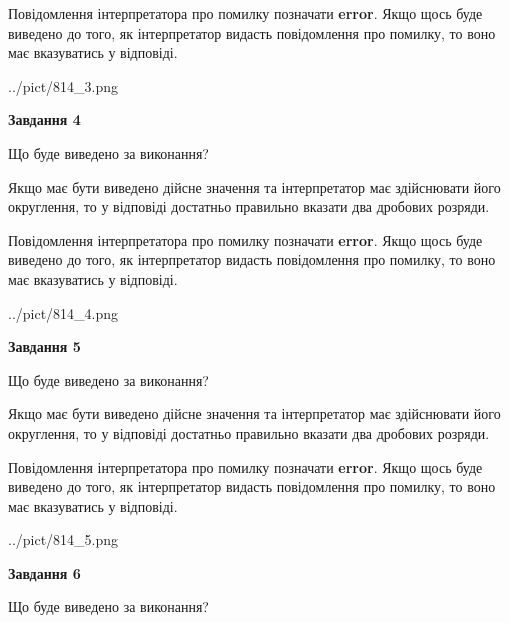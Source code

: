 \documentclass[12pt, ukrainian]{article}
\begin{document}
{\begin {Large}
Повідомлення інтерпретатора про помилку позначати \textbf{error}.
Якщо щось буде виведено до того, як інтерпретатор видасть повідомлення про помилку, 
то воно має вказуватись у відповіді. \par

\begin{center}
	{../pict/814_3.png}
\end{center}
\newpage

{\begin {center}\textbf{Завдання 4}\end {center}}\par
Що буде виведено за виконання? \par

Якщо має бути виведено дійсне значення та інтерпретатор має здійснювати його округлення, 
то у відповіді достатньо правильно вказати два дробових розряди.

Повідомлення інтерпретатора про помилку позначати \textbf{error}.
Якщо щось буде виведено до того, як інтерпретатор видасть повідомлення про помилку, 
то воно має вказуватись у відповіді. \par

\begin{center}
	{../pict/814_4.png}
\end{center}
\newpage

{\begin {center}\textbf{Завдання 5}\end {center}}\par
Що буде виведено за виконання? \par

Якщо має бути виведено дійсне значення та інтерпретатор має здійснювати його округлення, 
то у відповіді достатньо правильно вказати два дробових розряди.

Повідомлення інтерпретатора про помилку позначати \textbf{error}.
Якщо щось буде виведено до того, як інтерпретатор видасть повідомлення про помилку, 
то воно має вказуватись у відповіді. \par

\begin{center}
	{../pict/814_5.png}
\end{center}
\newpage

{\begin {center}\textbf{Завдання 6}\end {center}}\par
Що буде виведено за виконання? \par


\end{Large}}
\end{document}
